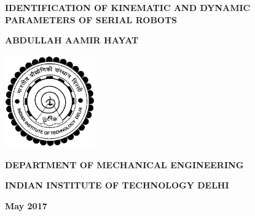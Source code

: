 \doublespacing
\thispagestyle{empty}
\begin{center}



\textbf{\large{IDENTIFICATION OF KINEMATIC AND DYNAMIC PARAMETERS OF SERIAL ROBOTS}}

\bigskip
\bigskip
\bigskip
\bigskip
\bigskip
\bigskip
\bigskip
\bigskip
\bigskip
\bigskip

\textbf{ABDULLAH AAMIR HAYAT}

\bigskip
\bigskip
\bigskip
\bigskip
\bigskip
\bigskip
\bigskip
\bigskip
\bigskip
\bigskip
\bigskip
\bigskip
\bigskip
\bigskip
\bigskip
\bigskip
\bigskip
\bigskip
\bigskip
\bigskip
\bigskip

\includegraphics[height=4cm]{Misc_front/iitlogo.eps}

\bigskip
\bigskip
\bigskip
\bigskip
\bigskip
\bigskip

\textbf{DEPARTMENT OF MECHANICAL ENGINEERING}

\textbf{INDIAN INSTITUTE OF TECHNOLOGY DELHI}

\textbf{May 2017}



\end{center}
\newpage
\thispagestyle{empty}
\mbox{}

